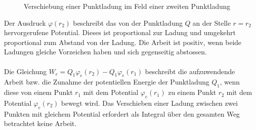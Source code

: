 \begin{figure}[H]
\centering
\caption{Verschiebung einer Punktladung im Feld einer zweiten Punktladung}
\label{fig_Ig}
\end{figure}
\noindent Der Ausdruck $\varphi\left(r_2\right)$ beschreibt das von der Punktladung $Q$ an der Stelle $r=r_2$ hervorgerufene Potential. Dieses ist proportional zur Ladung und umgekehrt proportional zum Abstand von der Ladung. Die Arbeit ist positiv, wenn beide Ladungen gleiche Vorzeichen haben und sich gegenseitig abstossen.
\\\\
Die Gleichung $W_e=Q_1\varphi_e\left(r_2\right)-Q_1\varphi_e\left(r_1\right)$ beschreibt die aufzuwendende Arbeit bzw. die Zunahme der potentiellen Energie der Punktladung $Q_1$, wenn diese von einem Punkt $r_1$ mit dem Potential $\varphi_e\left(r_1\right)$ zu einem Punkt $r_2$ mit dem Potential $\varphi_e\left(r_2\right)$  bewegt wird. Das Verschieben einer Ladung zwischen zwei Punkten mit gleichem Potential erfordert als Integral über den gesamten Weg betrachtet keine Arbeit. 
